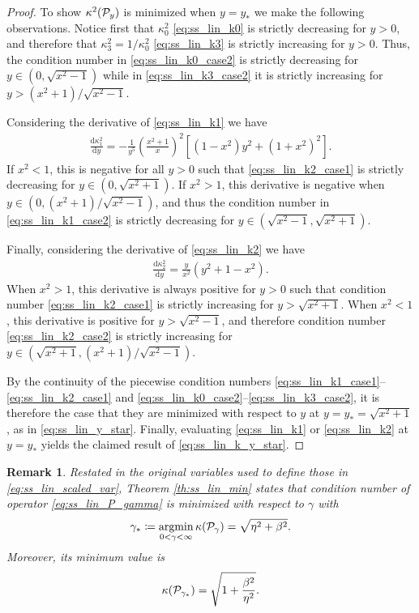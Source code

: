 \documentclass[a4paper,10pt]{article}
\newtheorem{remark}{Remark}
\begin{document}
\begin{proof}
To show $\kappa^2({\cal P}_y)$ is minimized when $y = y_*$ we make the following observations. Notice first that $\kappa_0^2$ \eqref{eq:ss_lin_k0} is strictly decreasing for $y > 0$, and therefore that $\kappa_3^2 = 1/\kappa_0^2$ \eqref{eq:ss_lin_k3} is strictly increasing for $y > 0$. Thus, the condition number in \eqref{eq:ss_lin_k0_case2} is strictly decreasing for $y \in (0, \sqrt{x^2-1})$ while in \eqref{eq:ss_lin_k3_case2} it is strictly increasing for $y > (x^2+1)/\sqrt{x^2-1}$.

Considering the derivative of \eqref{eq:ss_lin_k1} we have
\begin{align*}
\frac{\textrm{d} \kappa_1^2}{\textrm{d} y} 
= 
- \frac{1}{y^5}\left( \frac{x^2+1}{x} \right)^2 
\left[
(1-x^2) y^2 + (1+x^2)^2
\right].
\end{align*}
If $x^2 < 1$, this is negative for all $y > 0$ such that \eqref{eq:ss_lin_k2_case1} is strictly decreasing for $y \in (0, \sqrt{x^2+1})$. If $x^2 > 1$, this derivative is negative when $y \in (0, (x^2+1)/\sqrt{x^2-1})$, and thus the condition number in \eqref{eq:ss_lin_k1_case2} is strictly decreasing for $y \in (\sqrt{x^2-1},\sqrt{x^2+1})$.

Finally, considering the derivative of \eqref{eq:ss_lin_k2} we have
\begin{align*}
\frac{\textrm{d} \kappa_2^2}{\textrm{d} y} = \frac{y}{x^2} (y^2 + 1 - x^2).
\end{align*}
When $x^2 > 1$, this derivative is always positive for $y > 0$ such that condition number \eqref{eq:ss_lin_k2_case1} is strictly increasing for $y > \sqrt{x^2+1}$. When $x^2<1$, this derivative is positive for $y > \sqrt{x^2-1}$, and therefore condition number \eqref{eq:ss_lin_k2_case2} is strictly increasing for $y \in (\sqrt{x^2 + 1}, (x^2+1)/\sqrt{x^2-1})$.

By the continuity of the piecewise condition numbers \eqref{eq:ss_lin_k1_case1}--\eqref{eq:ss_lin_k2_case1} and \eqref{eq:ss_lin_k0_case2}--\eqref{eq:ss_lin_k3_case2}, it is therefore the case that they are minimized with respect to $y$ at $y = y_* = \sqrt{x^2 + 1}$, as in \eqref{eq:ss_lin_y_star}. Finally, evaluating \eqref{eq:ss_lin_k1} or \eqref{eq:ss_lin_k2} at $y = y_*$ yields the claimed result of \eqref{eq:ss_lin_k_y_star}.
\end{proof}

\begin{remark}
Restated in the original variables used to define those in \eqref{eq:ss_lin_scaled_var}, Theorem \ref{th:ss_lin_min} states that condition number of operator \eqref{eq:ss_lin_P_gamma} is minimized with respect to $\gamma$ with
\begin{align}
\gamma_* \coloneqq \underset{0 < \gamma < \infty}{\rm argmin} \, \kappa({\cal P}_{\gamma}) = \sqrt{\eta^2 + \beta^2}.
\end{align}
Moreover, its minimum value is
\begin{align}
\kappa({\cal P}_{\gamma_*}) = \sqrt{1 + \frac{\beta^2}{\eta^2}}.
\end{align}
\end{remark}
\end{document}
